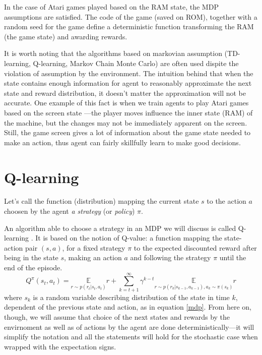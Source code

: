 In the case of Atari games played based on the RAM state, the MDP assumptions are satisfied. The code of the game (saved on ROM), together with a random seed for the game define a deterministic function transforming the RAM (the game state) and awarding rewards.

It is worth noting that the algorithms based on markovian assumption (TD-learning, Q-learning, Markov Chain Monte Carlo) are often used dispite the violation of assumption by the environment. The intuition behind that when the state contains enough information for agent to reasonably approximate the next state and reward distribution, it doesn't matter the approximation will not be accurate. One example of this fact is when we train agents to play Atari games based on the screen state \cite{nips-dqn}---the player moves influence the inner state (RAM) of the machine, but the changes may not be immediately apparent on the screen. Still, the game screen gives a lot of information about the game state needed to make an action, thus 
agent can fairly skillfully learn to make good decisions.

\section{Q-learning}
Let's call the function (distribution) mapping the current state $s$ to the action $a$ choosen by the agent \emph{a strategy} (or \emph{policy}) $\pi$.

An algorithm able to choose a strategy in an MDP we will discuss is called Q-learning \cite{qlearning, qlearning-old}. It is based on the notion of Q-value: a function mapping the state-action pair $(s, a)$, for a fixed strategy $\pi$ to the expected discounted reward after being in the state $s$, making an action $a$ and following the strategy $\pi$ until the end of the episode.
\begin{equation}\label{q-value}
  Q^\pi(s_t, a_t) = \underset{r\sim p(r_t | s_t, a_t)}{\mathbb{E}} r + \sum_{k=t+1}^\infty \gamma^{k-t}\underset{r\sim p(r_k|s_{k-1}, a_{k-1}), a_k\sim \pi(s_k)}{\mathbb{E}} r
\end{equation}
where $s_k$ is a random variable describing distribution of the state in time $k$, dependent of the previous state and action, as in equation \eqref{mdp}. From here on, though, we will assume that choice of the next states and rewards by the envirnoment as well as of actions by the agent are done deterministically---it will simplify the notation and all the statements will hold for the stochastic case when wrapped with the expectation signs.

